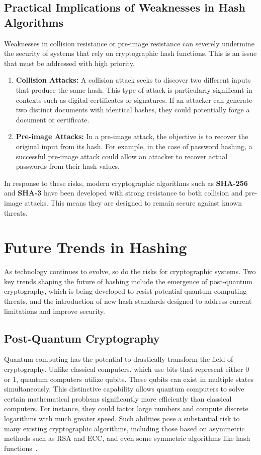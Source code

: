 \documentclass[11pt,a4paper]{article}
\begin{document}
    \subsection*{Practical Implications of Weaknesses in Hash Algorithms}
    Weaknesses in collision resistance or pre-image resistance can severely undermine the security of systems that rely on cryptographic hash functions. This is an issue that must be addressed with high priority.

        \begin{enumerate}
            \item \textbf{Collision Attacks:} A collision attack seeks to discover two different inputs that produce the same hash. This type of attack is particularly significant in contexts such as digital certificates or signatures. If an attacker can generate two distinct documents with identical hashes, they could potentially forge a document or certificate.

            \item \textbf{Pre-image Attacks:} In a pre-image attack, the objective is to recover the original input from its hash. For example, in the case of password hashing, a successful pre-image attack could allow an attacker to recover actual passwords from their hash values.

        \end{enumerate}
        In response to these risks, modern cryptographic algorithms such as \textbf{SHA-256} and \textbf{SHA-3} have been developed with strong resistance to both collision and pre-image attacks. This means they are designed to remain secure against known threats.

\section*{Future Trends in Hashing}
As technology continues to evolve, so do the risks for cryptographic systems. Two key trends shaping the future of hashing include the emergence of post-quantum cryptography, which is being developed to resist potential quantum computing threats, and the introduction of new hash standards designed to address current limitations and improve security.
    \subsection*{Post-Quantum Cryptography}
    Quantum computing has the potential to drastically transform the field of cryptography. Unlike classical computers, which use bits that represent either 0 or 1, quantum computers utilize qubits. These qubits can exist in multiple states simultaneously. This distinctive capability allows quantum computers to solve certain mathematical problems significantly more efficiently than classical computers. For instance, they could factor large numbers and compute discrete logarithms with much greater speed. Such abilities pose a substantial risk to many existing cryptographic algorithms, including those based on asymmetric methods such as RSA and ECC, and even some symmetric algorithms like hash functions~\cite{Post-Quantum}\cite{Post-Quantum-2}.
\end{document}
